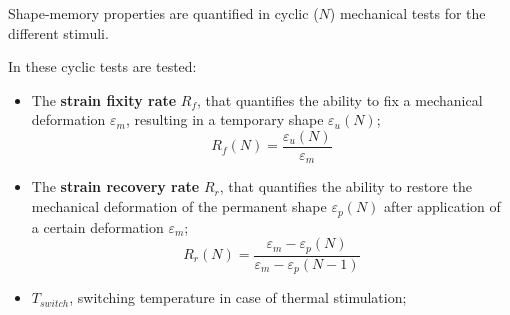 \documentclass[10pt]{beamer}
\begin{document}
\begin{frame}

Shape-memory properties are quantified in cyclic ($N$) mechanical tests for the different stimuli. \newline

In these cyclic tests are tested:		
\begin{itemize}
\item  The \textbf{strain fixity rate} $R_f$, that quantifies the ability to fix a mechanical deformation $\varepsilon_m$, resulting in a temporary shape $\varepsilon_u(N)$;
\[R_f(N) = \dfrac{\varepsilon_u(N)}{\varepsilon_m}\]
\item  The \textbf{strain recovery rate} $R_r$, that quantifies the ability to restore the mechanical deformation of the permanent shape $\varepsilon_p(N)$ after application of a certain deformation $\varepsilon_m$;
\[R_r(N) = \dfrac{\varepsilon_m-\varepsilon_p(N)}{\varepsilon_m-\varepsilon_p(N-1)}\]

\item $T_{switch}$, switching temperature in case of thermal stimulation;
\end{itemize}			
\end{frame}
\end{document}
